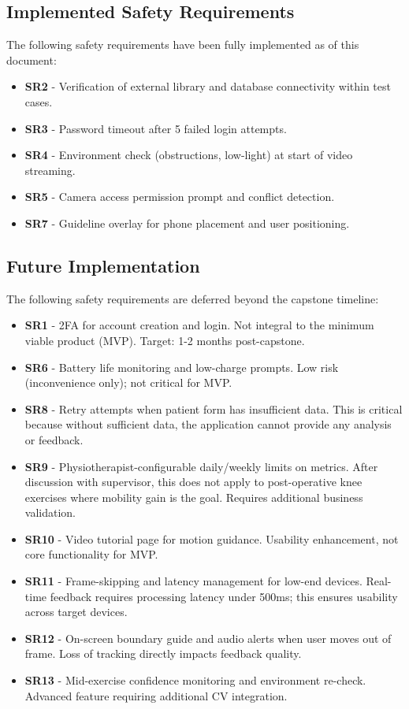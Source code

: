 \documentclass{article}
\begin{document}
\subsection*{Implemented Safety Requirements}

The following safety requirements have been fully implemented as of this document:

\begin{itemize}
    \item \textbf{SR2} - Verification of external library and database connectivity within test cases.
    \item \textbf{SR3} - Password timeout after 5 failed login attempts.
    \item \textbf{SR4} - Environment check (obstructions, low-light) at start of video streaming.
    \item \textbf{SR5} - Camera access permission prompt and conflict detection.
    \item \textbf{SR7} - Guideline overlay for phone placement and user positioning.
\end{itemize}

\subsection*{Future Implementation}

The following safety requirements are deferred beyond the capstone timeline:

\begin{itemize}
    \item \textbf{SR1} - 2FA for account creation and login. Not integral to the minimum viable product (MVP). Target: 1-2 months post-capstone.
    \item \textbf{SR6} - Battery life monitoring and low-charge prompts. Low risk (inconvenience only); not critical for MVP.
    \item \textbf{SR8} - Retry attempts when patient form has insufficient data. This is critical because without sufficient data, the application cannot provide any analysis or feedback.
    \item \textbf{SR9} - Physiotherapist-configurable daily/weekly limits on metrics. After discussion with supervisor, this does not apply to post-operative knee exercises where mobility gain is the goal. Requires additional business validation.
    \item \textbf{SR10} - Video tutorial page for motion guidance. Usability enhancement, not core functionality for MVP.
    \item \textbf{SR11} - Frame-skipping and latency management for low-end devices. Real-time feedback requires processing latency under 500ms; this ensures usability across target devices.
    \item \textbf{SR12} - On-screen boundary guide and audio alerts when user moves out of frame. Loss of tracking directly impacts feedback quality.
    \item \textbf{SR13} - Mid-exercise confidence monitoring and environment re-check. Advanced feature requiring additional CV integration.
\end{itemize}
\end{document}
